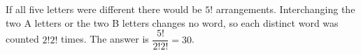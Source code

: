 If all five letters were different there would be $5!$ arrangements. Interchanging the two A letters or the two B letters changes no word, so each distinct word was counted $2!2!$ times. The answer is $\dfrac{5!}{2!2!}=\boxed{30}$.
